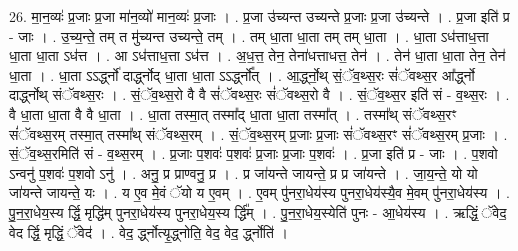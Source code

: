 \documentclass[17pt]{extarticle}
\begin{document}
26. मा॒न॒व्यः॑ प्र॒जाः प्र॒जा मा॑न॒व्यो॑ मान॒व्यः॑ प्र॒जाः । . प्र॒जा उ॑च्यन्त उच्यन्ते प्र॒जाः प्र॒जा उ॑च्यन्ते । . प्र॒जा इति॑ प्र - जाः । . उ॒च्य॒न्ते॒ तम् त मु॑च्यन्त उच्यन्ते॒ तम् । . तम् धा॒ता धा॒ता तम् तम् धा॒ता । . धा॒ता ऽध॑त्ताध॒त्ता धा॒ता धा॒ता ऽध॑त्त । . आ ऽध॑त्ताध॒त्ता ऽध॑त्त । . अ॒ध॒त्त॒ तेन॒ तेना॑धत्ताधत्त॒ तेन॑ । . तेन॑ धा॒ता धा॒ता तेन॒ तेन॑ धा॒ता । . धा॒ता ऽऽर्द्ध्नो॑ दार्द्ध्नोद् धा॒ता धा॒ता ऽऽर्द्ध्नो᳚त् । . आ॒र्द्ध्नो॒थ् सं॒ॅव॒थ्स॒रः सं॑ॅवथ्स॒र आ᳚र्द्ध्नो दार्द्ध्नोथ् संॅवथ्स॒रः । . सं॒ॅव॒थ्स॒रो वै वै सं॑ॅवथ्स॒रः सं॑ॅवथ्स॒रो वै । . सं॒ॅव॒थ्स॒र इति॑ सं - व॒थ्स॒रः । . वै धा॒ता धा॒ता वै वै धा॒ता । . धा॒ता तस्मा॒त् तस्मा᳚द् धा॒ता धा॒ता तस्मा᳚त् । . तस्मा᳚थ् संॅवथ्स॒रꣳ सं॑ॅवथ्स॒रम् तस्मा॒त् तस्मा᳚थ् संॅवथ्स॒रम् । . सं॒ॅव॒थ्स॒रम् प्र॒जाः प्र॒जाः सं॑ॅवथ्स॒रꣳ सं॑ॅवथ्स॒रम् प्र॒जाः । . सं॒ॅव॒थ्स॒रमिति॑ सं - व॒थ्स॒रम् । . प्र॒जाः प॒शवः॑ प॒शवः॑ प्र॒जाः प्र॒जाः प॒शवः॑ । . प्र॒जा इति॑ प्र - जाः । . प॒शवो ऽन्वनु॑ प॒शवः॑ प॒शवो ऽनु॑ । . अनु॒ प्र प्राण्वनु॒ प्र । . प्र जा॑यन्ते जायन्ते॒ प्र प्र जा॑यन्ते । . जा॒य॒न्ते॒ यो यो जा॑यन्ते जायन्ते॒ यः । . य ए॒व मे॒वं ॅयो य ए॒वम् । . ए॒वम् पु॑नरा॒धेय॑स्य पुनरा॒धेय॑स्यै॒व मे॒वम् पु॑नरा॒धेय॑स्य । . पु॒न॒रा॒धेय॒स्य र्द्धि॒ मृद्धि॑म् पुनरा॒धेय॑स्य पुनरा॒धेय॒स्य र्द्धि᳚म् । . पु॒न॒रा॒धेय॒स्येति॑ पुनः - आ॒धेय॑स्य । . ऋद्धिं॒ ॅवेद॒ वेद र्द्धि॒ मृद्धिं॒ ॅवेद॑ । . वेद॒ र्द्ध्नोत्यृ॒द्ध्नोति॒ वेद॒ वेद॒ र्द्ध्नोति॑ । \newline
\end{document}
